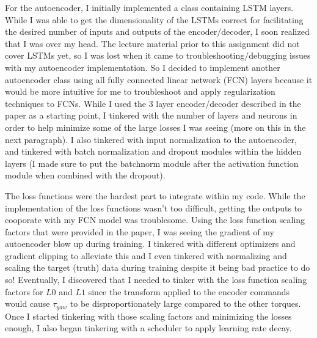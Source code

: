 \documentclass{article}
\begin{document}
For the autoencoder, I initially implemented a class containing LSTM layers. While I was able to get the dimensionality of the LSTMs correct for facilitating the desired number of inputs and outputs of the encoder/decoder, I soon realized that I was over my head. The lecture material prior to this assignment did not cover LSTMs yet, so I was lost when it came to troubleshooting/debugging issues with my autoencoder implementation. So I decided to implement another autoencoder class using all fully connected linear network (FCN) layers because it would be more intuitive for me to troubleshoot and apply regularization techniques to FCNs. While I used the 3 layer encoder/decoder described in the paper as a starting point, I tinkered with the number of layers and neurons in order to help minimize some of the large losses I was seeing (more on this in the next paragraph). I also tinkered with input normalization to the autoencoder, and tinkered with batch normalization and dropout modules within the hidden layers (I made sure to put the batchnorm module after the activation function module when combined with the dropout). 

The loss functions were the hardest part to integrate within my code. While the implementation of the loss functions wasn't too difficult, getting the outputs to cooporate with my FCN model was troublesome. Using the loss function scaling factors that were provided in the paper, I was seeing the gradient of my autoencoder blow up during training. I tinkered with different optimizers and gradient clipping to alleviate this \textemdash\space and I even tinkered with normalizing and scaling the target (truth) data during training despite it being bad practice to do so! Eventually, I discovered that I needed to tinker with the loss function scaling factors for $L0$ and $L1$ since the transform applied to the encoder commands would cause $\tau_{yaw}$ to be disproportionately large compared to the other torques. Once I started tinkering with those scaling factors and minimizing the losses enough, I also began tinkering with a scheduler to apply learning rate decay.
\end{document}
